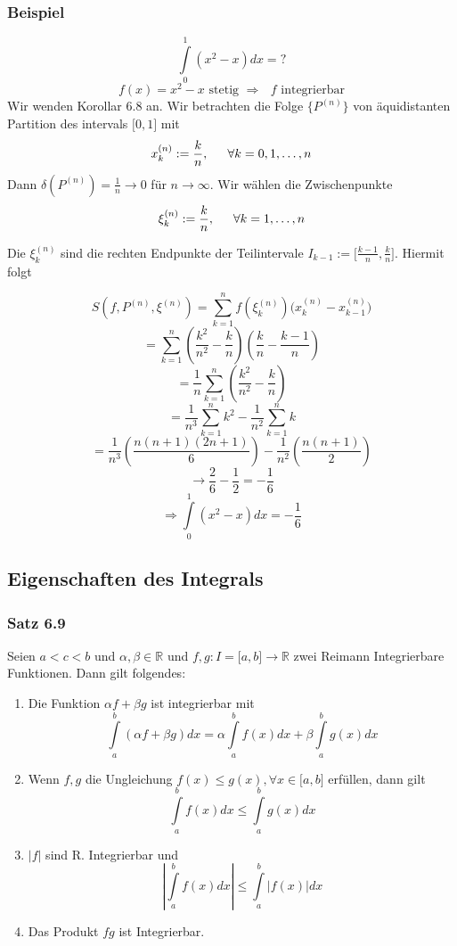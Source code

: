 \subsubsection*{Beispiel}
\[\int\limits_0^1 {({x^2} - x)dx = ?} \]
$$f(x) = {x^2} - x \text{ stetig }\Rightarrow\text{ $f$ integrierbar}$$
Wir wenden Korollar 6.8 an. Wir betrachten die Folge $\{ P^{(n)}\}$ von äquidistanten Partition des intervals $\lbrack 0,1\rbrack$ mit \[x_k^{(n)}: = \frac{k}{n},\text{\indent}\forall k = 0,1, \ldots ,n\]
Dann $\delta(P^{(n)})=\frac{1}{n}\rightarrow 0$ für $n\rightarrow\infty$. Wir wählen die Zwischenpunkte 
\[\xi _k^{(n)}: = \frac{k}{n},\text{\indent}\forall k = 1, \ldots ,n\]

Die $\xi _k^{(n)}$ sind die rechten Endpunkte der Teilintervale $I_{k-1}:=\lbrack \frac{k-1}{n},\frac{k}{n}\rbrack$. Hiermit folgt

$$S(f,{P^{(n)}},{\xi ^{(n)}}) = \sum\limits_{k = 1}^n {f(\xi _k^{(n)})(x_k^{(n)} - x_{k - 1}^{(n)}} )$$
 $$= \sum\limits_{k = 1}^n {\left( {\frac{{{k^2}}}{{{n^2}}} - \frac{k}{n}} \right)\left( {\frac{k}{n} - \frac{{k - 1}}{n}} \right)} $$
$$ = \frac{1}{n}\sum\limits_{k = 1}^n {\left( {\frac{{{k^2}}}{{{n^2}}} - \frac{k}{n}} \right)} $$
$$ = \frac{1}{{{n^3}}}\sum\limits_{k = 1}^n {{k^2}}  - \frac{1}{{{n^2}}}\sum\limits_{k = 1}^n k $$
$$ = \frac{1}{{{n^3}}}\left( {\frac{{n(n + 1)(2n + 1)}}{6}} \right) - \frac{1}{{{n^2}}}\left( {\frac{{n(n + 1)}}{2}} \right)$$
 $$\to \frac{2}{6} - \frac{1}{2} =  - \frac{1}{6}$$
$$ \Rightarrow \int\limits_0^1 {({x^2} - x)dx =  - \frac{1}{6}} $$

\subsection*{Eigenschaften des Integrals}
\subsubsection*{Satz 6.9}
Seien $a<c<b$ und $\alpha, \beta \in \mathbb{R}$ und $f,g:I=\lbrack a,b \rbrack\rightarrow\mathbb{R}$ zwei Reimann Integrierbare Funktionen. Dann gilt folgendes:
\begin{enumerate}
\item Die Funktion $\alpha f + \beta g$ ist integrierbar mit $$\int\limits_a^b {(\alpha f + \beta g)dx = \alpha \int\limits_a^b {f(x)dx + \beta \int\limits_a^b {g(x)dx} } } $$
\item Wenn $f,g$ die Ungleichung $f(x)\leq g(x), \forall x\in\lbrack a,b\rbrack$ erfüllen, dann gilt \[\int\limits_a^b {f(x)dx \le \int\limits_a^b {g(x)dx} } \]
\item $\left| f \right|$ sind R. Integrierbar und $$\left| {\int\limits_a^b {f(x)dx} } \right| \le \int\limits_a^b {\left| {f(x)} \right|dx} $$
\item Das Produkt $fg$ ist Integrierbar.
\end{enumerate}

